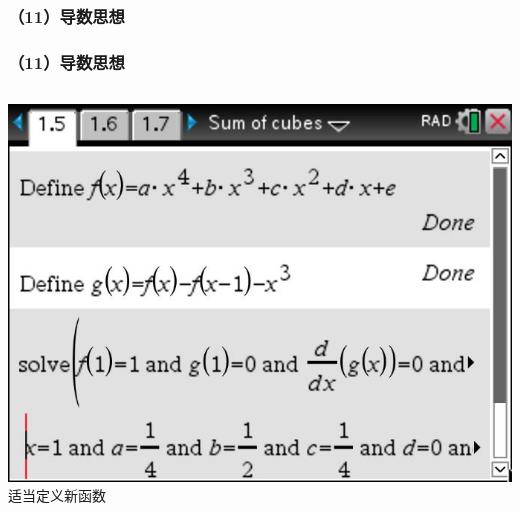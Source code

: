 \documentclass[aspectratio=169]{beamer}
\begin{document}
\subsubsection{（11）导数思想}
       \begin{frame}
       \frametitle{（11）导数思想}
       \begin{columns}
       	\includegraphics[scale=0.22]{导数1.jpg}\\
       	\scriptsize{适当定义新函数}\\
       	\hspace{1cm}
       	

\end{columns}
\end{frame}
\end{document}
